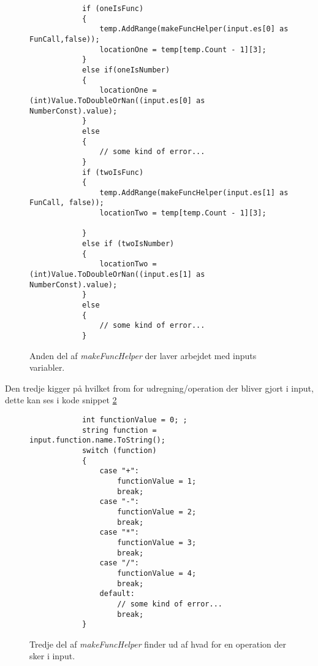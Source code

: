 \begin{figure}[!ht]
    \centering
    \lstset{style=sharpc}
	\begin{lstlisting}
            if (oneIsFunc)
            {
                temp.AddRange(makeFuncHelper(input.es[0] as FunCall,false));
                locationOne = temp[temp.Count - 1][3];
            }
            else if(oneIsNumber)
            {
                locationOne = (int)Value.ToDoubleOrNan((input.es[0] as NumberConst).value);
            }
            else
            {
                // some kind of error...
            }
            if (twoIsFunc)
            {
                temp.AddRange(makeFuncHelper(input.es[1] as FunCall, false));
                locationTwo = temp[temp.Count - 1][3];
               
            }
            else if (twoIsNumber)
            {
                locationTwo = (int)Value.ToDoubleOrNan((input.es[1] as NumberConst).value);
            }
            else
            {
                // some kind of error...
            }
	\end{lstlisting}
    \caption{Anden del af \textit{makeFuncHelper} der laver arbejdet med inputs variabler.}
    \label{fig:makeFuncHelper_part_2}
\end{figure}

Den tredje kigger på hvilket from for udregning/operation der bliver gjort i input, dette kan ses i kode snippet \ref{fig:makeFuncHelper_part_3}

\begin{figure}[!ht]
    \centering
    \lstset{style=sharpc}
	\begin{lstlisting}
            int functionValue = 0; ;
            string function = input.function.name.ToString();
            switch (function)
            {
                case "+":
                    functionValue = 1;
                    break;
                case "-":
                    functionValue = 2;
                    break;
                case "*":
                    functionValue = 3;
                    break;
                case "/":
                    functionValue = 4;
                    break;
                default:
                    // some kind of error...
                    break;
            }
	\end{lstlisting}
    \caption{Tredje del af \textit{makeFuncHelper} finder ud af hvad for en operation der sker i input.}
    \label{fig:makeFuncHelper_part_3}
\end{figure}

